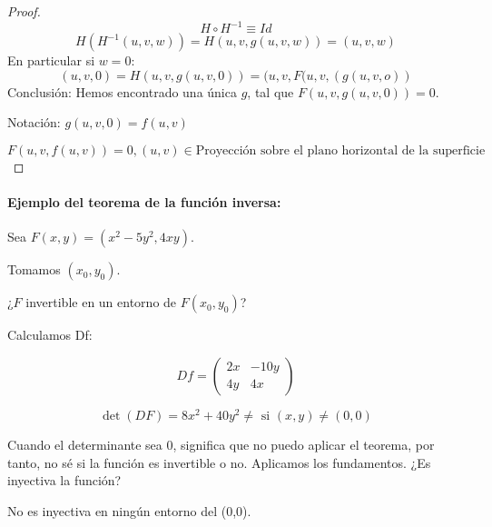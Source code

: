 \documentclass{apuntes}
\begin{document}
\begin{proof}
 $$H\circ H^{-1} \equiv Id$$
 $$H(H^{-1}(u,v,w)) = H(u,v,g(u,v,w)) = (u,v,w)$$
 En particular si $w=0$:
 $$(u,v,0) = H(u,v,g(u,v,0)) = (u,v,F(u,v,(g(u,v,o))$$
 Conclusión: Hemos encontrado una única $g$, tal que $F(u,v,g(u,v,0)) = 0$.
 
  Notación: $g(u,v,0) = f(u,v)$
  
  $F(u,v,f(u,v)) = 0, (u,v) \in \text{Proyección sobre el plano horizontal de la superficie}$
  
\end{proof}

\paragraph{Ejemplo del teorema de la función inversa:\\}
Sea $F(x,y) = (x^2-5y^2,4xy)$.

Tomamos $(x_0,y_0)$.

¿$F$ invertible en un entorno de $F(x_0,y_0)$?

Calculamos Df:

$$Df = \begin{pmatrix}
        2x&-10y\\
        4y & 4x 
       \end{pmatrix}
$$

$$\det(DF) = 8x^2 + 40y^2 \neq \text{ si } (x,y) \neq (0,0)$$

Cuando el determinante sea 0, significa que no puedo aplicar el teorema, por tanto, no sé si la función es invertible o no. Aplicamos los fundamentos. ¿Es inyectiva la función?

No es inyectiva en ningún entorno del (0,0).
\end{document}

